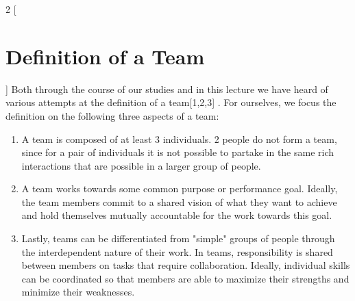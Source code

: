 \begin{multicols}{2}
[\section{Definition of a Team}]
Both through the course of our studies and in this lecture we have heard of various attempts at the definition of a team[1,2,3] \cite{katzenbach2003the,BuildingBlocks}. 
For ourselves, we focus the definition on the following three aspects of a team:

  \begin{enumerate}[1.]
	\item A team is composed of at least 3 individuals. 2 people do not form a team, since for a pair of individuals it is not possible to partake in the same rich interactions that are possible in a larger group of people.
	\item A team works towards some common purpose or performance goal. Ideally, the team members commit to a shared vision of what they want to achieve and hold themselves mutually accountable for the work towards this goal.
	\item Lastly, teams can be differentiated from "simple" groups of people through the interdependent nature of their work. In teams, responsibility is shared between members on tasks that require collaboration. Ideally, individual skills can be coordinated so that members are able to maximize their strengths and minimize their weaknesses.
  \end{enumerate}
\end{multicols}